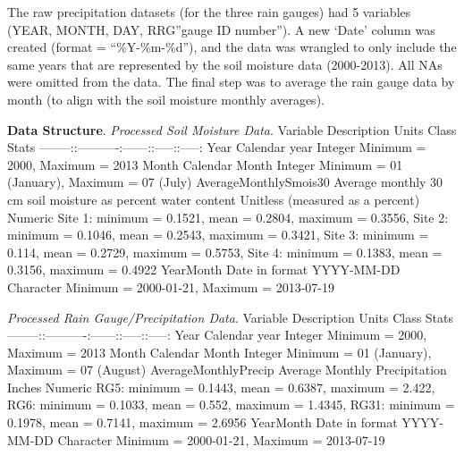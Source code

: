 \documentclass[
  12pt,
]{article}
\begin{document}
The raw precipitation datasets (for the three rain gauges) had 5
variables (YEAR, MONTH, DAY, RRG''gauge ID number''). A new `Date'
column was created (format = ``\%Y-\%m-\%d''), and the data was wrangled
to only include the same years that are represented by the soil moisture
data (2000-2013). All NAs were omitted from the data. The final step was
to average the rain gauge data by month (to align with the soil moisture
monthly averages).

\textbf{Data Structure}. \emph{Processed Soil Moisture Data}.
\textbar Variable \textbar{} Description \textbar{} Units \textbar{}
Class \textbar{} Stats\textbar{}
\textbar--------:\textbar:----------:\textbar------:\textbar:-----:\textbar:-----:\textbar{}
\textbar Year \textbar{} Calendar year \textbar{} \textbar{} Integer
\textbar{} Minimum = 2000, Maximum = 2013\textbar{} \textbar Month
\textbar{} Calendar Month \textbar{} \textbar{} Integer \textbar{}
Minimum = 01 (January), Maximum = 07 (July)\textbar{}
\textbar AverageMonthlySmois30 \textbar{} Average monthly 30 cm soil
moisture as percent water content \textbar{} Unitless (measured as a
percent) \textbar{} Numeric \textbar{} Site 1: minimum = 0.1521, mean =
0.2804, maximum = 0.3556, Site 2: minimum = 0.1046, mean = 0.2543,
maximum = 0.3421, Site 3: minimum = 0.114, mean = 0.2729, maximum =
0.5753, Site 4: minimum = 0.1383, mean = 0.3156, maximum = 0.4922
\textbar{} \textbar YearMonth \textbar{} Date in format YYYY-MM-DD
\textbar{} \textbar{} Character \textbar{} Minimum = 2000-01-21, Maximum
= 2013-07-19\textbar{}

\emph{Processed Rain Gauge/Precipitation Data}. Variable \textbar{}
Description \textbar{} Units \textbar{} Class \textbar{} Stats
\textbar--------:\textbar:----------:\textbar------:\textbar:-----:\textbar:-----:\textbar{}
\textbar Year \textbar{} Calendar year \textbar{} \textbar{} Integer
\textbar{} Minimum = 2000, Maximum = 2013\textbar{} \textbar Month
\textbar{} Calendar Month \textbar{} \textbar{} Integer \textbar{}
Minimum = 01 (January), Maximum = 07 (August)\textbar{}
\textbar AverageMonthlyPrecip \textbar{} Average Monthly Precipitation
\textbar{} Inches \textbar{} Numeric \textbar{} RG5: minimum = 0.1443,
mean = 0.6387, maximum = 2.422, RG6: minimum = 0.1033, mean = 0.552,
maximum = 1.4345, RG31: minimum = 0.1978, mean = 0.7141, maximum =
2.6956 \textbar{} \textbar YearMonth \textbar{} Date in format
YYYY-MM-DD \textbar{} \textbar{} Character \textbar{} Minimum =
2000-01-21, Maximum = 2013-07-19\textbar{}

\newpage
\end{document}
